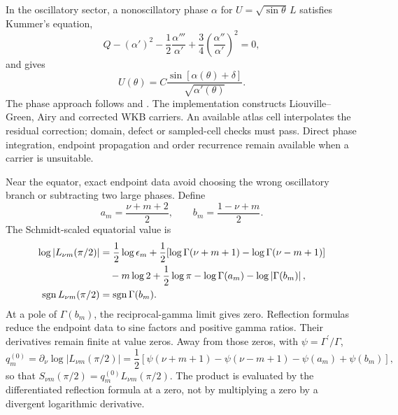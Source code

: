 ﻿\documentclass[11pt,a4paper]{article}
\newcommand{\sgn}{\operatorname{sgn}}
\newcommand{\abs}[1]{\left|#1\right|}
\begin{document}
In the oscillatory sector, a nonoscillatory phase $\alpha$ for $U=\sqrt{\sin\theta}\,L$ satisfies Kummer's equation,
\begin{equation}
 Q-(\alpha')^2-\frac12\frac{\alpha'''}{\alpha'}
 +\frac34\left(\frac{\alpha''}{\alpha'}\right)^2=0,
\end{equation}
and gives
\begin{equation}
 U(\theta)=C\frac{\sin[\alpha(\theta)+\delta]}{\sqrt{\alpha'(\theta)}}.
 \label{eq:phase_representation}
\end{equation}
The phase approach follows \citet{BremerRokhlin2017} and \citet{Bremer2018}. The implementation constructs Liouville--Green, Airy and corrected WKB carriers. An available atlas cell interpolates the residual correction; domain, defect or sampled-cell checks must pass. Direct phase integration, endpoint propagation and order recurrence remain available when a carrier is unsuitable.

Near the equator, exact endpoint data avoid choosing the wrong oscillatory branch or subtracting two large phases. Define
\begin{equation}
 a_m=\frac{\nu+m+2}{2},\qquad b_m=\frac{1-\nu+m}{2}.
\end{equation}
The Schmidt-scaled equatorial value is
\begin{align}
 \log\abs{L_{\nu m}(\pi/2)}
 &=\frac12\log\epsilon_m
 +\frac12\!\left[\log\Gamma(\nu+m+1)-\log\Gamma(\nu-m+1)\right]
 \notag\\
 &\quad-m\log2+\frac12\log\pi-\log\Gamma(a_m)
 -\log\abs{\Gamma(b_m)},\\
 \sgn L_{\nu m}(\pi/2)&=\sgn\Gamma(b_m).
 \label{eq:legendre_equator_value}
\end{align}
At a pole of $\Gamma(b_m)$, the reciprocal-gamma limit gives zero. Reflection formulas reduce the endpoint data to sine factors and positive gamma ratios. Their derivatives remain finite at value zeros. Away from those zeros, with $\psi=\Gamma^{\prime}/\Gamma$,
\begin{equation}
 q_m^{(0)}=\partial_\nu\log\abs{L_{\nu m}(\pi/2)}
 =\frac12\left[\psi(\nu+m+1)-\psi(\nu-m+1)
 -\psi(a_m)+\psi(b_m)\right],
 \label{eq:legendre_equator_degree_sensitivity}
\end{equation}
so that $S_{\nu m}(\pi/2)=q_m^{(0)}L_{\nu m}(\pi/2)$. The product is evaluated by the differentiated reflection formula at a zero, not by multiplying a zero by a divergent logarithmic derivative.
\end{document}
